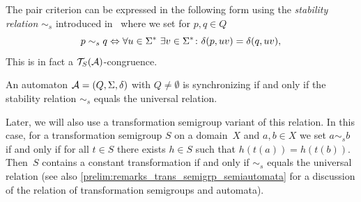  \label{def:stability}
The pair criterion can be expressed in the following form using
the \emph{stability relation} $\sim_s$ introduced in~\cite{DBLP:journals/ijfcs/CulikKK02,DBLP:journals/jucs/Kari02}
where we set for $p,q \in Q$
\[
p \sim_s q \Leftrightarrow \forall u \in \Sigma^* \  \exists v \in \Sigma^* \colon \delta(p,uv) = \delta(q,uv),
\]
This is in fact a $\mathcal T_S(\mathcal A)$-congruence.

\begin{corollary} \label{prelim:cor:stability-sync}
	An automaton $\mathcal A = (Q, \Sigma, \delta)$ with $Q \ne \emptyset$
	is synchronizing if and only if 
	the stability relation $\sim_s$ equals the universal relation.
\end{corollary}

Later, we will also use a transformation semigroup variant of this relation.
In this case, for a transformation semigroup $S$ on a domain~$X$
and $a,b \in X$ we set $a \sim_s b$
if and only if for all $t \in S$ there exists $h \in S$ such that $h(t(a)) = h(t(b))$.
Then~$S$ contains a constant transformation if and only if $\sim_s$ equals
the universal relation (see also \cref{prelim:remarks_trans_semigrp_semiautomata} for a discussion
of the relation of transformation semigroups and automata).